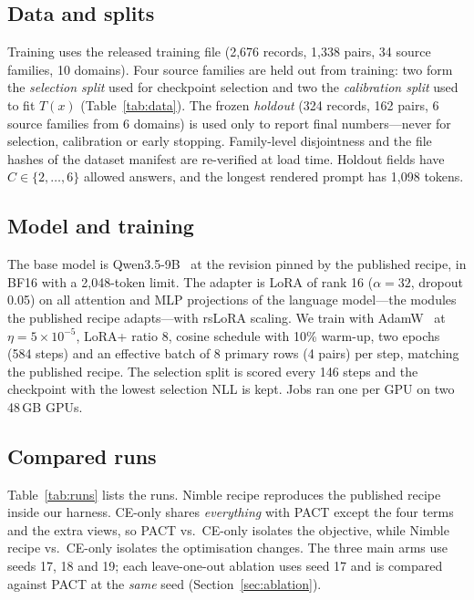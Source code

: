 \documentclass[conference]{IEEEtran}
\newcommand{\run}[1]{#1}
\begin{document}
\subsection{Data and splits}
Training uses the released training file (2{,}676 records, 1{,}338 pairs,
34 source families, 10 domains). Four source families are held out from
training: two form the \emph{selection split} used for checkpoint selection
and two the \emph{calibration split} used to fit $T(x)$ (Table~\ref{tab:data}).
The frozen \emph{holdout} (324 records, 162 pairs, 6 source families from 6
domains) is used only to report final numbers---never for selection,
calibration or early stopping. Family-level disjointness and the file hashes
of the dataset manifest are re-verified at load time. Holdout fields have
$C\in\{2,\dots,6\}$ allowed answers, and the longest rendered prompt has
1{,}098 tokens.



\subsection{Model and training}
The base model is Qwen3.5-9B~\cite{qwen35} at the revision pinned by the
published recipe, in BF16 with a 2{,}048-token limit. The adapter is LoRA of
rank 16 ($\alpha{=}32$, dropout 0.05) on all attention and MLP projections of
the language model---the modules the published recipe adapts---with rsLoRA
scaling. We train with AdamW~\cite{loshchilov2019adamw} at $\eta=5\times10^{-5}$,
LoRA+ ratio 8, cosine schedule with 10\% warm-up, two epochs (584 steps) and an
effective batch of 8 primary rows (4 pairs) per step, matching the published
recipe. The selection split is scored every 146 steps and the checkpoint with
the lowest selection NLL is kept. Jobs ran one per GPU on two 48\,GB GPUs.

\subsection{Compared runs}
Table~\ref{tab:runs} lists the runs. \run{Nimble recipe} reproduces the
published recipe inside our harness. \run{CE-only} shares \emph{everything}
with PACT except the four terms and the extra views, so PACT vs.\ \run{CE-only}
isolates the objective, while \run{Nimble recipe} vs.\ \run{CE-only} isolates
the optimisation changes. The three main arms use seeds 17, 18 and 19; each
leave-one-out ablation uses seed 17 and is compared against PACT at the
\emph{same} seed (Section~\ref{sec:ablation}).
\end{document}
